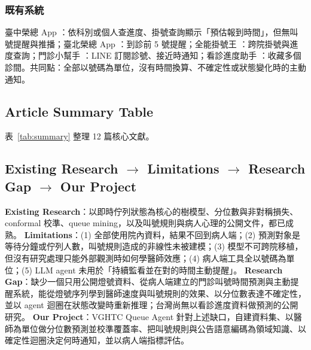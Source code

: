 \documentclass[11pt,twocolumn]{article}
\begin{document}
\subsubsection{既有系統}
臺中榮總 App \cite{vghtcapp}：依科別或個人查進度、掛號查詢顯示「預估報到時間」，但無叫號提醒與推播；臺北榮總 App \cite{vghtpeapp}：到診前 5 號提醒；全能掛號王 \cite{seedoctor}：跨院掛號與進度查詢；門診小幫手 \cite{docbot2020}：LINE 訂閱診號、接近時通知；看診進度助手 \cite{opdhelper}：收藏多個診間。共同點：全部以號碼為單位，沒有時間換算、不確定性或狀態變化時的主動通知。

\subsection{Article Summary Table}
表~\ref{tab:summary} 整理 12 篇核心文獻。

\subsection{Existing Research $\rightarrow$ Limitations $\rightarrow$ Research Gap $\rightarrow$ Our Project}
\textbf{Existing Research}：以即時佇列狀態為核心的樹模型、分位數與非對稱損失、conformal 校準、queue mining，以及叫號規則與病人心理的公開文件，都已成熟。
\textbf{Limitations}：(1) 全部使用院內資料，結果不回到病人端；(2) 預測對象是等待分鐘或佇列人數，叫號規則造成的非線性未被建模；(3) 模型不可跨院移植，但沒有研究處理只能外部觀測時如何學醫師效應；(4) 病人端工具全以號碼為單位；(5) LLM agent 未用於「持續監看並在對的時間主動提醒」。
\textbf{Research Gap}：缺少一個只用公開燈號資料、從病人端建立的門診叫號時間預測與主動提醒系統，能從燈號序列學到醫師速度與叫號規則的效果、以分位數表達不確定性，並以 agent 迴圈在狀態改變時重新推理；台灣尚無以看診進度資料做預測的公開研究。
\textbf{Our Project}：VGHTC Queue Agent 針對上述缺口，自建資料集、以醫師為單位做分位數預測並校準覆蓋率、把叫號規則與公告語意編碼為領域知識、以確定性迴圈決定何時通知，並以病人端指標評估。
\end{document}
